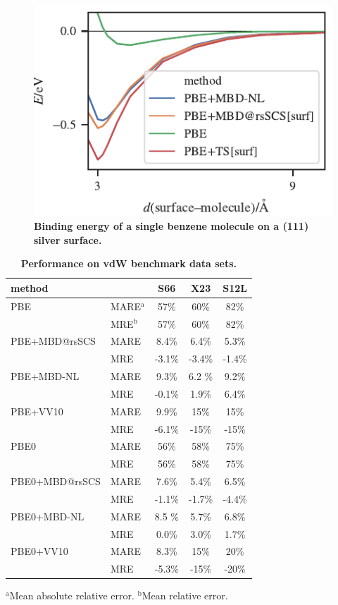 \begin{figure}[t!]
\centering
\includegraphics[width=\linewidth]{../media/surface.pdf}
\caption{\textbf{Binding energy of a single benzene molecule on a (111) silver surface.}
}\label{fig:silver-benzene}
\end{figure}

\begin{table}[t!]
\centering
\caption{\textbf{Performance on vdW benchmark data sets.}}\label{tab:performance}
\begin{tabular}{ll*{3}{S[
  table-format=2.1,
  table-align-text-post=false,
  table-space-text-post=\%,
]}}
\toprule
method & & {S66} & {X23} & {S12L} \\
\midrule
PBE            & MARE$^\text{a}$ & 57\%   & 60\%   & 82\%   \\
               & MRE$^\text{b}$ & 57\%   & 60\%   & 82\%   \\
PBE+MBD@rsSCS  & MARE & 8.4\%  & 6.4\%  & 5.3\%  \\
               & MRE & -3.1\% & -3.4\% & -1.4\% \\
PBE+MBD-NL     & MARE & 9.3\%  & 6.2 \% & 9.2\%  \\
               & MRE & -0.1\% & 1.9\%  & 6.4\%  \\
PBE+VV10       & MARE & 9.9\%  & 15\%   & 15\%   \\
               & MRE & -6.1\% & -15\%  & -15\%  \\
\midrule
PBE0           & MARE & 56\%   & 58\%   & 75\%   \\
               & MRE & 56\%   & 58\%   & 75\%   \\
PBE0+MBD@rsSCS & MARE & 7.6\%  & 5.4\%  & 6.5\%  \\
               & MRE & -1.1\% & -1.7\% & -4.4\% \\
PBE0+MBD-NL    & MARE & 8.5 \% & 5.7\%  & 6.8\%  \\
               & MRE & 0.0\%  & 3.0\%  & 1.7\%  \\
PBE0+VV10      & MARE & 8.3\%  & 15\%   & 20\%   \\
               & MRE & -5.3\% & -15\%  & -20\%  \\
\bottomrule
\end{tabular}

\small
$^\text{a}$Mean absolute relative error.
$^\text{b}$Mean relative error.
\end{table}

